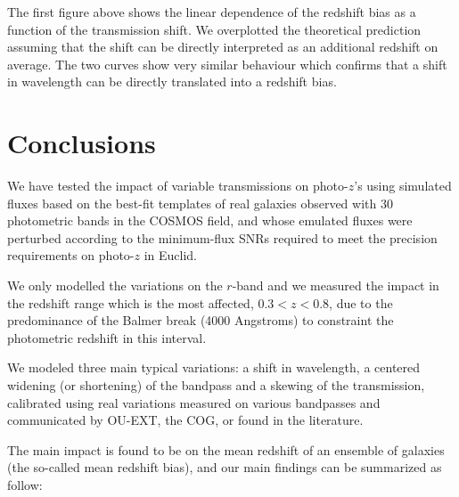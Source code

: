 \documentclass[11pt]{article}
\begin{document}
    The first figure above shows the linear dependence of the redshift bias
as a function of the transmission shift. We overplotted the theoretical
prediction assuming that the shift can be directly interpreted as an
additional redshift on average. The two curves show very similar
behaviour which confirms that a shift in wavelength can be directly
translated into a redshift bias.

    \section{Conclusions}\label{conclusions}

We have tested the impact of variable transmissions on photo-\(z\)'s
using simulated fluxes based on the best-fit templates of real galaxies
observed with 30 photometric bands in the COSMOS field, and whose
emulated fluxes were perturbed according to the minimum-flux SNRs
required to meet the precision requirements on photo-\(z\) in Euclid.

We only modelled the variations on the \(r\)-band and we measured the
impact in the redshift range which is the most affected, \(0.3<z<0.8\),
due to the predominance of the Balmer break (4000 Angstroms) to
constraint the photometric redshift in this interval.

We modeled three main typical variations: a shift in wavelength, a
centered widening (or shortening) of the bandpass and a skewing of the
transmission, calibrated using real variations measured on various
bandpasses and communicated by OU-EXT, the COG, or found in the
literature.

The main impact is found to be on the mean redshift of an ensemble of
galaxies (the so-called mean redshift bias), and our main findings can
be summarized as follow:
\end{document}
